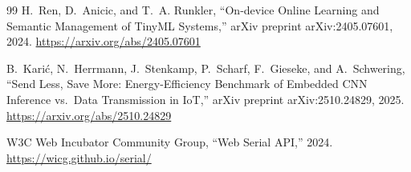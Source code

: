 \documentclass[12pt]{article}
\begin{document}
\begin{thebibliography}{99}
H.~Ren, D.~Anicic, and T.~A. Runkler, ``On-device Online Learning and Semantic Management of TinyML Systems,'' arXiv preprint arXiv:2405.07601, 2024.
\url{https://arxiv.org/abs/2405.07601}

B.~Kari\'{c}, N.~Herrmann, J.~Stenkamp, P.~Scharf, F.~Gieseke, and A.~Schwering, ``Send Less, Save More: Energy-Efficiency Benchmark of Embedded CNN Inference vs.\ Data Transmission in IoT,'' arXiv preprint arXiv:2510.24829, 2025.
\url{https://arxiv.org/abs/2510.24829}

W3C Web Incubator Community Group, ``Web Serial API,'' 2024.
\url{https://wicg.github.io/serial/}

\end{thebibliography}
\end{document}
